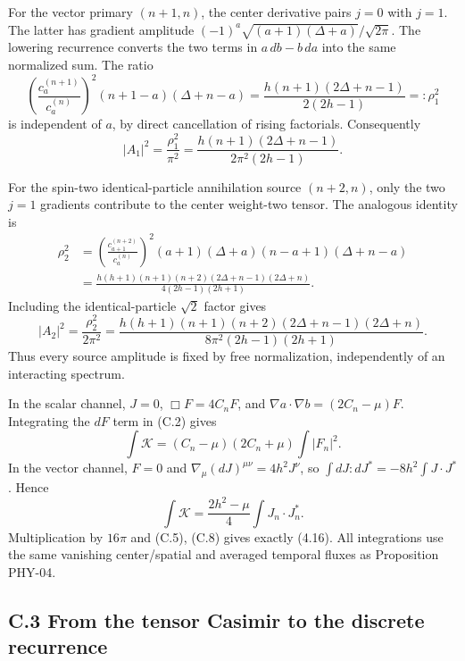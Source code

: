 \documentclass[a4paper,11pt]{article}
\numberwithin{equation}{section}
\begin{document}
For the vector primary \((n+1,n)\), the center derivative pairs \(j=0\) with \(j=1\). The latter has gradient amplitude \((-1)^a\sqrt{(a+1)(\Delta+a)}/\sqrt{2\pi}\). The lowering recurrence converts the two terms in \(a\,db-b\,da\) into the same normalized sum. The ratio \[
\left(\frac{c_a^{(n+1)}}{c_a^{(n)}}\right)^2
(n+1-a)(\Delta+n-a)
=\frac{h(n+1)(2\Delta+n-1)}{2(2h-1)}
=:\rho_1^2
\tag{C.7}
\] is independent of \(a\), by direct cancellation of rising factorials. Consequently \[
|A_1|^2=\frac{\rho_1^2}{\pi^2}
=\frac{h(n+1)(2\Delta+n-1)}
{2\pi^2(2h-1)} .
\tag{C.8}
\]

For the spin-two identical-particle annihilation source \((n+2,n)\), only the two \(j=1\) gradients contribute to the center weight-two tensor. The analogous identity is \[
\begin{aligned}
\rho_2^2&=
\left(\frac{c_{a+1}^{(n+2)}}{c_a^{(n)}}\right)^2
(a+1)(\Delta+a)(n-a+1)(\Delta+n-a)
\\&=\frac{h(h+1)(n+1)(n+2)(2\Delta+n-1)(2\Delta+n)}
{4(2h-1)(2h+1)}
.
\end{aligned}
\tag{C.9}
\] Including the identical-particle \(\sqrt2\) factor gives \[
|A_2|^2=\frac{\rho_2^2}{2\pi^2}
=\frac{h(h+1)(n+1)(n+2)(2\Delta+n-1)(2\Delta+n)}
{8\pi^2(2h-1)(2h+1)} .
\tag{C.10}
\] Thus every source amplitude is fixed by free normalization, independently of an interacting spectrum.

In the scalar channel, \(J=0\), \(\Box F=4C_nF\), and \(\nabla a\cdot\nabla b=(2C_n-\mu)F\). Integrating the \(dF\) term in (C.2) gives \[
\int\mathcal K=(C_n-\mu)(2C_n+\mu)\int|F_n|^2 .
\] In the vector channel, \(F=0\) and \(\nabla_\mu(dJ)^{\mu\nu}=4h^2J^\nu\), so \(\int dJ:dJ^*=-8h^2\int J\cdot J^*\). Hence \[
\int\mathcal K=\frac{2h^2-\mu}{4}\int J_n\cdot J_n^* .
\tag{C.11}
\] Multiplication by \(16\pi\) and (C.5), (C.8) gives exactly (4.16). All integrations use the same vanishing center/spatial and averaged temporal fluxes as Proposition PHY-04.

\hypertarget{c.3-from-the-tensor-casimir-to-the-discrete-recurrence}{%
\subsection{C.3 From the tensor Casimir to the discrete recurrence}\label{c.3-from-the-tensor-casimir-to-the-discrete-recurrence}}
\end{document}

